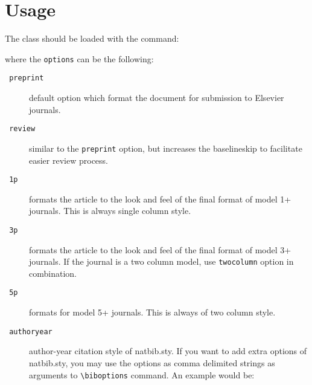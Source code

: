 \documentclass[a4paper,12pt]{article}
\def\file#1{\textsf{#1}\xspace}
\begin{document}
\section{Usage}\label{sec:usage}
The class should be loaded with the command:


\noindent where the \verb+options+ can be the following:


\begin{description}

\item [{\tt\color{verbcolor} preprint}]  default option which format the
  document for submission to Elsevier journals.

\item [{\tt\color{verbcolor} review}]  similar to the \verb+preprint+
option, but increases the baselineskip to facilitate easier review
process.

\item [{\tt\color{verbcolor} 1p}]  formats the article to the look and
feel of the final format of model 1+ journals. This is always single
column style.

\item [{\tt\color{verbcolor} 3p}] formats the article to the look and
feel of the final format of model 3+ journals. If the journal is a two
column model, use \verb+twocolumn+ option in combination.

\item [{\tt\color{verbcolor} 5p}] formats for model 5+ journals. This
is always of two column style.

\item [{\tt\color{verbcolor} authoryear}] author-year citation style of
\file{natbib.sty}. If you want to add extra options of
\file{natbib.sty}, you may use the options as comma delimited strings
as arguments to \verb+\biboptions+ command. An example would be:
\end{description}

\begin{vquote}
\end{vquote}
\end{document}
